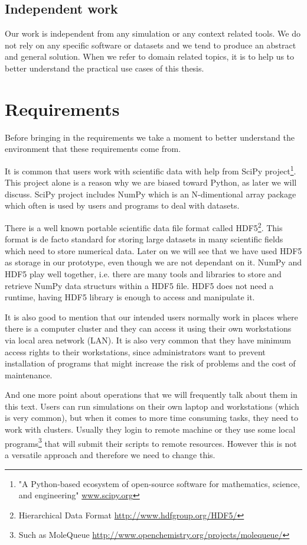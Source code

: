 \subsection{Independent work}
Our work is independent from any simulation or any context related tools.
We do not rely on any specific software or datasets 
and we tend to produce an abstract and general solution.
When we refer to domain related topics, 
it is to help us to better understand the practical use cases of this thesis.


\section{Requirements}
Before bringing in the requirements we take a moment to better understand the environment that these requirements come from.

It is common that users work with scientific data with help from SciPy 
project\footnote{"A Python-based ecosystem of open-source software for mathematics, science, and engineering" \url{www.scipy.org}}.
This project alone is a reason why we are biased toward Python, as later we will discuss.
SciPy project includes NumPy which is an N-dimentional array package which often is used by users and programs
to deal with datasets. 

There is a well known portable scientific data file format called 
HDF5\footnote{Hierarchical Data Format \url{http://www.hdfgroup.org/HDF5/}}.
This format is de facto standard for storing large datasets in many scientific fields which need to store numerical data.
Later on we will see that we have used HDF5 as storage in our prototype, even though we are not dependant on it.
NumPy and HDF5 play well together, i.e. there are many tools and libraries to store and retrieve NumPy data structurs 
within a HDF5 file. HDF5 does not need a runtime, having HDF5 library is enough to access and manipulate it.

It is also good to mention that our intended users normally work in places where there is a computer cluster
and they can access it using their own workstations via local area network (LAN).
It is also very common that they have minimum access rights to their workstations, 
since administrators want to prevent installation of programs that might increase the risk of problems and the cost of maintenance.

And one more point about operations that we will frequently talk about them in this text.
Users can run simulations on their own laptop and workstations (which is very common),
but when it comes to more time consuming tasks, they need to work with clusters.
Usually they login to remote machine or they use some local programs\footnote{Such as MoleQueue \url{http://www.openchemistry.org/projects/molequeue/}}
 that will submit their scripts to remote resources.
However this is not a versatile approach and therefore we need to change this.

